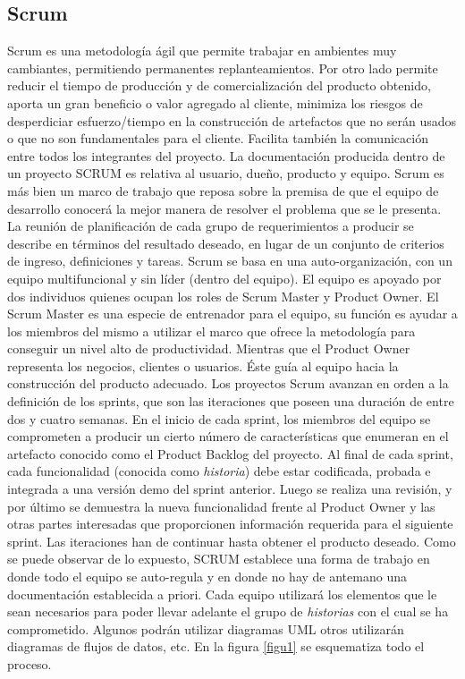 \subsection{Scrum}
Scrum es una metodología ágil que permite trabajar en ambientes muy cambiantes, permitiendo permanentes replanteamientos. 
Por otro lado permite reducir el tiempo de producción y de comercialización del producto obtenido, aporta un gran beneficio o 
valor agregado al cliente, minimiza los riesgos de desperdiciar esfuerzo/tiempo en la construcción de artefactos que no serán usados 
o que no son fundamentales para el cliente. Facilita también la comunicación entre todos los integrantes del proyecto. 
La documentación producida dentro de un proyecto SCRUM es relativa al usuario, dueño, producto y equipo.  Scrum es más bien un marco de 
trabajo que reposa sobre la premisa de que el equipo de desarrollo conocerá la mejor manera de resolver el problema que se le presenta. 
La reunión de planificación de cada grupo de requerimientos a producir se describe en términos del resultado deseado, 
en lugar de un conjunto de criterios de ingreso, definiciones y tareas. 
Scrum se basa en una auto-organización, con un equipo multifuncional y sin líder (dentro del equipo). 
El equipo es apoyado por dos individuos quienes ocupan los roles de Scrum Master y  Product Owner. 
El Scrum Master es una especie de entrenador para el equipo, su función es ayudar a los miembros del mismo a utilizar el marco que ofrece 
la metodología para conseguir un nivel alto de productividad. Mientras que el Product Owner representa los negocios, clientes o 
usuarios. Éste guía al equipo hacia la construcción del producto adecuado.
 Los proyectos Scrum avanzan en orden a la definición de los sprints, que son las iteraciones que poseen una duración de entre dos y cuatro semanas. 
En el inicio de cada sprint, los miembros del equipo se comprometen a producir un cierto número de características que enumeran en 
el artefacto conocido como el Product Backlog del proyecto.  Al final de cada sprint, cada funcionalidad (conocida como \emph{historia}) debe estar codificada,
 probada e integrada a una versión demo del sprint anterior. Luego se realiza una revisión, y por último se demuestra la nueva funcionalidad
 frente al Product Owner y las otras partes interesadas que proporcionen información requerida para el siguiente sprint. 
Las iteraciones han de continuar hasta obtener el producto deseado.
Como se puede observar de lo expuesto, SCRUM establece una forma de trabajo en donde todo el equipo se auto-regula y en donde no hay de antemano
una documentación establecida a priori. Cada equipo utilizará los elementos que le sean necesarios  para poder llevar adelante el grupo de \emph{historias}
con el cual se ha comprometido. Algunos podrán utilizar diagramas UML\cite{} otros utilizarán diagramas de flujos de datos, etc.
En la figura \ref{figu1} se esquematiza todo el proceso.

